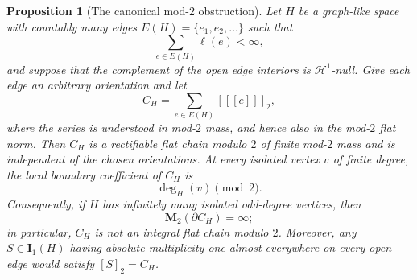 \documentclass[10pt,a4paper]{amsart}
\newtheorem{proposition}{Proposition}
\newcommand{\Hh}{\mathcal H}
\newcommand{\I}{\mathbf I}
\newcommand{\M}{\mathbf M}
\newcommand{\llbracket}{[\![}
\newcommand{\rrbracket}{]\!]}
\begin{document}
\begin{proposition}[The canonical mod-$2$ obstruction]\label{prop:mod2}
Let $H$ be a graph-like space with countably many edges
$E(H)=\{e_1,e_2,\ldots\}$ such that
\[
       \sum_{e\in E(H)}\ell(e)<\infty,
\]
and suppose that the complement of the open edge interiors is
$\Hh^1$-null. Give each edge an arbitrary orientation and let
\[
       C_H=\sum_{e\in E(H)}[\llbracket e\rrbracket]_2,
\]
where the series is understood in mod-$2$ mass, and hence also in the
mod-$2$ flat norm. Then $C_H$ is a rectifiable flat chain modulo $2$ of
finite mod-$2$ mass and is independent of the chosen orientations. At every
isolated vertex $v$ of finite degree, the local boundary coefficient of
$C_H$ is
\[
       \deg_H(v)\pmod2.
\]
Consequently, if $H$ has infinitely many isolated odd-degree vertices, then
\[
       \M_2(\partial C_H)=\infty;
\]
in particular, $C_H$ is not an integral flat chain modulo $2$. Moreover, any $S\in\I_1(H)$ having absolute multiplicity one almost everywhere on every open edge would satisfy $[S]_2=C_H$.
\end{proposition}
\end{document}
